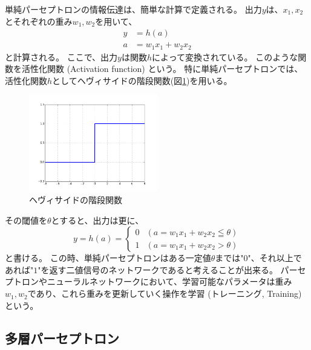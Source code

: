 単純パーセプトロンの情報伝達は、簡単な計算で定義される。
出力$y$は、$x_1,x_2$とそれぞれの重み$w_1,w_2$を用いて、
\begin{equation}
 \begin{split}
  y &= h(a)\\
  a &= w_1x_1 + w_2x_2
 \end{split}
\end{equation}
と計算される。
ここで、出力$y$は関数$h$によって変換されている。
このような関数を活性化関数 (Activation function) という。
特に単純パーセプトロンでは、活性化関数$h$としてヘヴィサイドの階段関数(図\ref{3HeavisideStepFunction})を用いる。

\begin{figure}[htbp]
 \centering
 \includegraphics[width=0.5\textwidth]{Figure/2DeepLearning/3HeavisideStepFunction.png}
 \caption{ヘヴィサイドの階段関数}
 \label{3HeavisideStepFunction}
\end{figure}

その閾値を$\theta$とすると、出力は更に、
\begin{equation}
 y = h(a) = \left\{ \begin{array}{ll}
    0 & (a = w_1x_1 + w_2x_2 \leqq \theta) \\
    1 & (a = w_1x_1 + w_2x_2 > \theta)
 \end{array} \right.
\end{equation}
と書ける。
この時、単純パーセプトロンはある一定値$\theta$までは"$0$"、それ以上であれば"$1$"を返す二値信号のネットワークであると考えることが出来る。
パーセプトロンやニューラルネットワークにおいて、学習可能なパラメータは重み$w_1,w_2$であり、これら重みを更新していく操作を学習 (トレーニング, Training) という。


\subsection{多層パーセプトロン} \label{DL:Percep:MultiLayerPerceptron}

